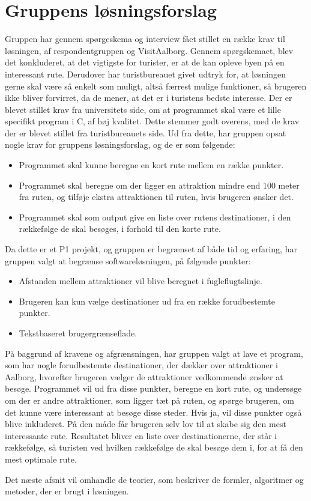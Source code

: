 \section{Gruppens løsningsforslag}
Gruppen har gennem spørgeskema og interview fået stillet en række krav til løsningen, af respondentgruppen og VisitAalborg. 
Gennem spørgskemaet, blev det konkluderet, at det vigtigste for turister, er at de kan opleve byen på en interessant rute. 
Derudover har turistbureauet givet udtryk for, at løsningen gerne skal være så enkelt som muligt, altså færrest mulige funktioner, så brugeren ikke bliver forvirret, da de mener, at det er i turistens bedste interesse. \newline
Der er blevet stillet krav fra universitets side, om at programmet skal være et lille specifikt program i C, af høj kvalitet. Dette stemmer godt overens, med de krav der er blevet stillet fra turistbureauets side.   \newline
Ud fra dette, har gruppen opsat nogle krav for gruppens løsningsforslag, og de er som følgende:
\begin{itemize}
	\item Programmet skal kunne beregne en kort rute mellem en række punkter.
	\item Programmet skal beregne om der ligger en attraktion mindre end 100 meter fra ruten, og tilføje ekstra attraktionen til ruten, hvis brugeren ønsker det.
	\item Programmet skal som output give en liste over rutens destinationer, i den rækkefølge de skal besøges, i forhold til den korte rute.
\end{itemize}

Da dette er et P1 projekt, og gruppen er begrænset af både tid og erfaring, har gruppen valgt at begrænse softwareløsningen, på følgende punkter: 
\begin{itemize}
	\item Afstanden mellem attraktioner vil blive beregnet i fugleflugtslinje.
	\item Brugeren kan kun vælge destinationer ud fra en række forudbestemte punkter.
	\item Tekstbaseret brugergrænseflade.
\end{itemize}

På baggrund af kravene og afgrænsningen, har gruppen valgt at lave et program, som har nogle forudbestemte destinationer, der dækker over attraktioner i Aalborg, hvorefter brugeren vælger de attraktioner vedkommende ønsker at besøge. Programmet vil ud fra disse punkter, beregne en kort rute, og undersøge om der er andre attraktioner, som ligger tæt på ruten, og spørge brugeren, om det kunne være interessant at besøge disse steder. Hvis ja, vil disse punkter også blive inkluderet. På den måde får brugeren selv lov til at skabe sig den mest interessante rute. Resultatet bliver en liste over destinationerne, der står i rækkefølge, så turisten ved hvilken rækkefølge de skal besøge dem i, for at få den mest optimale rute.\newline

Det næste afsnit vil omhandle de teorier, som beskriver de formler, algoritmer og metoder, der er brugt i løsningen.

